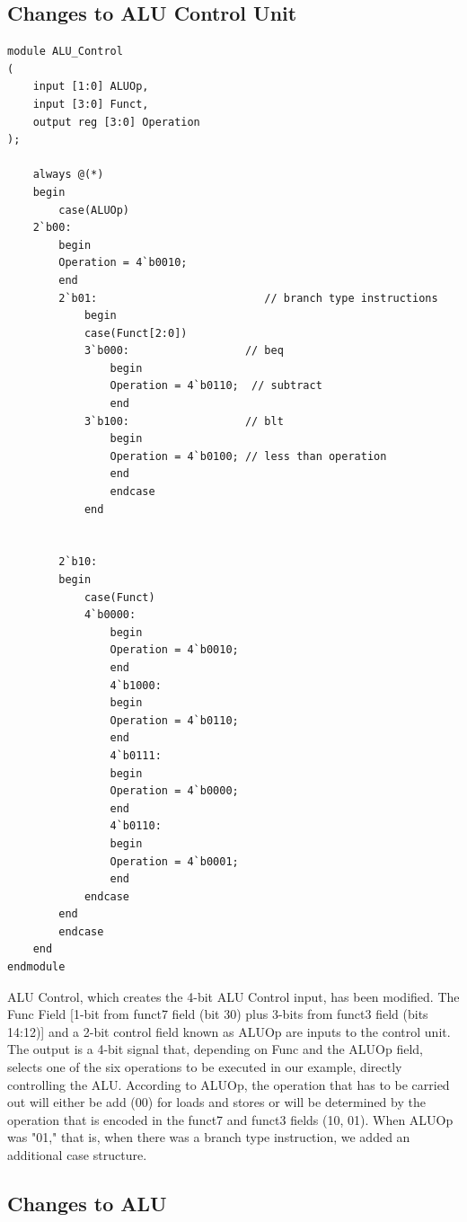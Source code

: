 \documentclass{article}
\begin{document}
\subsection{Changes to ALU Control Unit}

\begin{lstlisting}[caption={Changes to ALU Control Unit}, captionpos=b, language=RISC-V]
module ALU_Control
(
    input [1:0] ALUOp, 
    input [3:0] Funct,
    output reg [3:0] Operation
);

    always @(*)
    begin
        case(ALUOp)
    2`b00:
        begin
        Operation = 4`b0010;
        end
        2`b01:                          // branch type instructions
            begin
            case(Funct[2:0])
            3`b000:                  // beq
                begin
                Operation = 4`b0110;  // subtract
                end
            3`b100:                  // blt
                begin
                Operation = 4`b0100; // less than operation 
                end
                endcase
            end
            
        
        2`b10:
        begin
            case(Funct)
            4`b0000: 
                begin
                Operation = 4`b0010;
                end
                4`b1000:
                begin
                Operation = 4`b0110;
                end
                4`b0111:
                begin
                Operation = 4`b0000;
                end
                4`b0110:
                begin
                Operation = 4`b0001;
                end
            endcase
        end
        endcase
    end    
endmodule
\end{lstlisting}

ALU Control, which creates the 4-bit ALU Control input, has been modified. The Func Field [1-bit from funct7 field (bit 30) plus 3-bits from funct3 field (bits 14:12)] and a 2-bit control field known as ALUOp are inputs to the control unit. The output is a 4-bit signal that, depending on Func and the ALUOp field, selects one of the six operations to be executed in our example, directly controlling the ALU. According to ALUOp, the operation that has to be carried out will either be add (00) for loads and stores or will be determined by the operation that is encoded in the funct7 and funct3 fields (10, 01). When ALUOp was "01," that is, when there was a branch type instruction, we added an additional case structure.

\subsection{Changes to ALU}
\end{document}
